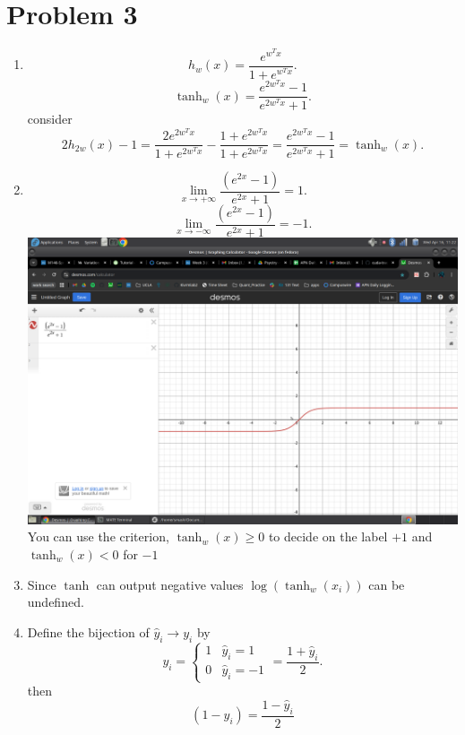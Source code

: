 \documentclass[11pt]{article}
\newcommand{\solution}[1]{{{\color{blue}{\bf Solution:} {#1}}}}
\begin{document}
\section{Problem 3}
\solution{
    \begin{enumerate}
        \item 
            \[
            h_w(x) = \frac{e^{w^{T}x}}{1 + e^{w^{T}x}}
            .\] 
            \[
                \tanh_w(x) = \frac{e^{2w^{T}x} - 1}{e^{2w^{T}x}+1}
            .\] 
            consider
            \[
            2h_{2w}(x) - 1 = \frac{2e^{2w^{T}x}}{1 + e^{2w^{T}x}} - \frac{1 + e^{2w^{T}x}}{1 + e^{2w^{T}x}} = \frac{e^{2w^{T}x}-1}{e^{2w^{T}x} + 1} = \tanh_w(x)
            .\] 
        \item 
            \[
            \lim_{x\to +\infty} \frac{\left(e^{2x}-1\right)}{e^{2x}+1} = 1
            .\] 
            \[
            \lim_{x\to -\infty} \frac{\left(e^{2x}-1\right)}{e^{2x}+1} = -1
            .\] 
            \includegraphics[width = \textwidth]{tanh.png} You can use the criterion, $\tanh_w(x) \ge 0$ to decide on the label $+1$ and $\tanh_w(x) < 0$ for $-1$
        \item Since $\tanh$ can output negative values $\log(\tanh_w(x_i))$ can be undefined.
        \item Define the bijection of $\hat y_i \rightarrow  y_i$ by
            \[
            y_i = 
            \begin{cases}
                1 & \hat y_i = 1\\
                0 & \hat y_i = -1
            \end{cases}
             =  \frac{1 + \hat y_i}{2}
            .\] 
            then
            \[
                (1-y_i) = \frac{1-\hat y_i}{2}
\]
\end{enumerate}}
\end{document}
